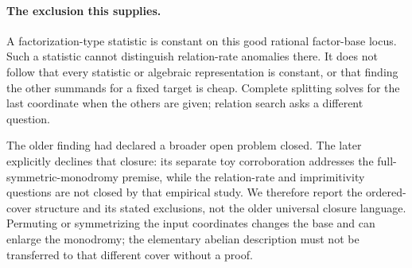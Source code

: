 \paragraph{The exclusion this supplies.}
A factorization-type statistic is constant on this good rational
factor-base locus. Such a statistic cannot distinguish relation-rate
anomalies there. It does not follow that every statistic or algebraic
representation is constant, or that finding the other summands for a
fixed target is cheap. Complete splitting solves for the last coordinate
when the others are given; relation search asks a different question.

The older finding  had declared a broader open problem
closed. The later  explicitly declines that closure:
its separate toy corroboration addresses the full-symmetric-monodromy
premise, while the relation-rate and imprimitivity questions are not
closed by that empirical study. We therefore report the ordered-cover
structure and its stated exclusions, not the older universal closure
language. Permuting or symmetrizing the input coordinates changes the
base and can enlarge the monodromy; the elementary abelian description
must not be transferred to that different cover without a proof.
